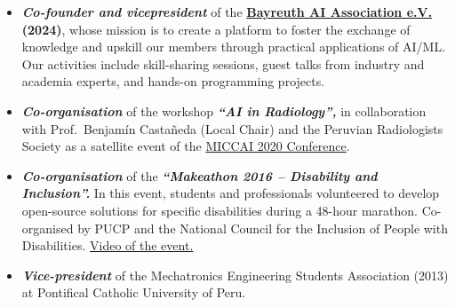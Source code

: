 \documentclass[a4paper,10pt]{article}
\begin{document}
\begin{itemize}
  \item \textbf{\textit{Co-founder and vicepresident}} of the
        \textbf{\href{https://www.ai-association.uni-bayreuth.de/en/index.html}{Bayreuth AI Association e.V.}
        (2024)}, whose mission is to create a platform to foster the exchange of knowledge and
        upskill our members through practical applications of AI/ML. Our activities include
        skill-sharing sessions, guest talks from industry and academia experts, and hands-on
        programming projects.

  \item \textbf{\textit{Co-organisation}} of the workshop \textbf{\textit{``AI in Radiology'',}}
        in collaboration with Prof.\ Benjam\'in Casta\~neda (Local Chair) and the Peruvian
        Radiologists Society as a satellite event of the
        \href{https://www.miccai2020.org/en/}{MICCAI 2020 Conference}.

  \item \textbf{\textit{Co-organisation}} of the \textbf{\textit{``Makeathon 2016 -- Disability
        and Inclusion''.}} In this event, students and professionals volunteered to develop
        open-source solutions for specific disabilities during a 48-hour marathon. Co-organised by
        PUCP and the National Council for the Inclusion of People with Disabilities.
        \href{https://www.youtube.com/watch?v=YoldwjsR4V8}{Video of the event.}

  \item \textbf{\textit{Vice-president}} of the Mechatronics Engineering Students Association
        (2013) at Pontifical Catholic University of Peru.
\end{itemize}
\end{document}
